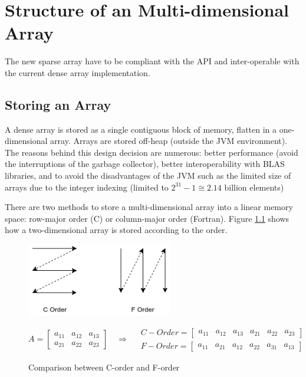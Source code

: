 \chapter{Structure of an Multi-dimensional Array}
The new sparse array have to be compliant with the API and inter-operable with the current dense array implementation.



\section{Storing an Array}
\label{sec:storing}

A dense array is stored as a single contiguous block of memory, flatten in a one-dimensional array. Arrays are stored off-heap (outside the JVM environment). The reasons behind this design decision are numerous: better performance (avoid the interruptions of the garbage collector), better interoperability with BLAS libraries, and to avoid the disadvantages of the {JVM} such as the limited size of arrays due to the integer indexing (limited to $2^{31}-1 \cong 2.14 \text{ billion}$ elements)

There are two methods to store a multi-dimensional array into a linear memory space: row-major order (C) or column-major order (Fortran). Figure \ref{fig:orders} shows how a two-dimensional array is stored according to the order.

\begin{figure}[h]
	\begin{center}
		\includegraphics[width=2.5in]{images/c_f_OrdersLabelled.png} 
		\label{fig:cOrders}
	\end{center}
	\[
	A = 
	\begin{bmatrix}
	a_{11} &  a_{12} & a_{13} \\
	a_{21} &  a_{22} & a_{23}
	\end{bmatrix}
	\quad\Rightarrow\quad
	\begin{aligned}
	C-Order = 
	\begin{bmatrix}
	a_{11} &  a_{12} & a_{13} & a_{21} &  a_{22} & a_{23}
	\end{bmatrix}
	\\
	F-Order = 
	\begin{bmatrix}
	a_{11} &  a_{21} & a_{12} & a_{22} &  a_{31} & a_{13}
	\end{bmatrix}
	\end{aligned}
	\]
\caption{Comparison between C-order and F-order}
\label{fig:orders}

\end{figure}

